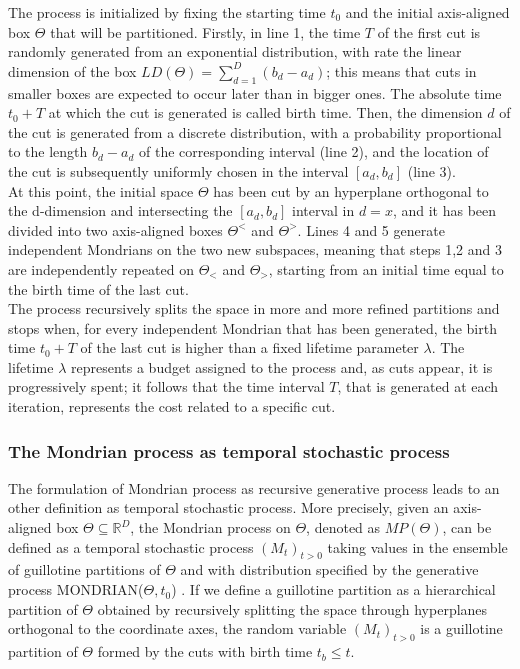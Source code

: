 \documentclass[a4paper]{article}
\begin{document}
The process is initialized by fixing the starting time $t_0$ and the initial axis-aligned box $\Theta$ that will be partitioned.
Firstly, in line 1, the time $T$ of the first cut is randomly generated from an exponential distribution, with rate the linear dimension of the box $LD(\Theta) = \sum_{d=1}^D(b_d-a_d)$;
this means that cuts in smaller boxes are expected to occur later than in bigger ones.
The absolute time $t_0 +T$ at which the cut is generated is called birth time. 
Then, the dimension $d$ of the cut is generated from a discrete distribution, with a probability proportional to the length $b_d-a_d$ of the corresponding interval (line 2), and the location of the cut is subsequently uniformly chosen in the interval $[a_d,b_d]$ (line 3).\\
At this point, the initial space $\Theta$ has been cut by an hyperplane orthogonal to the d-dimension and intersecting the $[a_d,b_d]$ interval in $d=x$, and it has been divided into two axis-aligned boxes $\Theta^<$ and $\Theta^>$.
Lines 4 and 5 generate independent Mondrians on the two new subspaces, meaning that steps 1,2 and 3 are independently repeated on $\Theta_<$ and $\Theta_>$, starting from an initial time equal to the birth time of the last cut. \\
The process recursively splits the space in more and more refined partitions and stops when, for every independent Mondrian that has been generated, the birth time $t_0+T$ of the last cut is higher than a fixed lifetime parameter $\lambda$.
The lifetime $\lambda$ represents a budget assigned to the process and, as cuts appear, it is progressively spent;
it follows that the time interval $T$, that is generated at each iteration, represents the cost related to a specific cut.


\subsubsection*{The Mondrian process as temporal stochastic process}
The formulation of Mondrian process as recursive generative process leads to an other definition as temporal stochastic process.
More precisely, given an axis-aligned box $\Theta \subseteq \mathbb{R}^D$, the Mondrian process on $\Theta$, denoted as $MP(\Theta)$, can be defined as a temporal stochastic process $(M_t)_{t>0}$ taking values in the ensemble of guillotine partitions of $\Theta$ and with distribution specified by the generative process MONDRIAN($\Theta,t_0$) \cite{2015MPMachineLearning}.
If we define a guillotine partition as a hierarchical partition of $\Theta$ obtained by recursively splitting the space through hyperplanes orthogonal to the coordinate axes, the random variable $(M_t)_{t>0}$ is a %
guillotine partition of $\Theta$ formed by the cuts with birth time $t_b \leq t$.%
\end{document}
